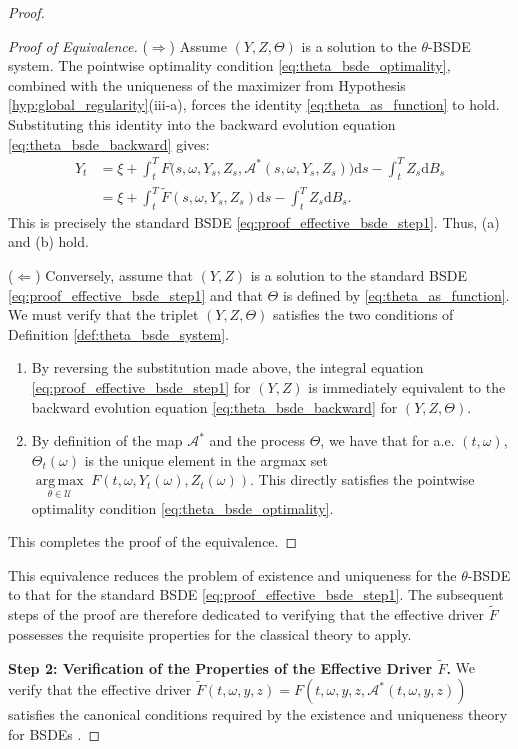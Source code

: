 \documentclass[12pt, letterpaper]{amsart}
\newcommand{\Thetacal}{\mathcal{A}}
\newcommand{\Ucal}{\mathcal{U}}
\newcommand{\dd}{\mathrm{d}}
\DeclareMathOperator*{\argmax}{arg\,max}
\theoremstyle{plain}
\theoremstyle{definition}
\theoremstyle{remark}
\numberwithin{equation}{section} %
\begin{document}
\begin{proof}
\begin{proof}[Proof of Equivalence]
($\Rightarrow$) Assume $(Y,Z,\Theta)$ is a solution to the $\theta$-BSDE system. The pointwise optimality condition \eqref{eq:theta_bsde_optimality}, combined with the uniqueness of the maximizer from Hypothesis \ref{hyp:global_regularity}(iii-a), forces the identity \eqref{eq:theta_as_function} to hold. Substituting this identity into the backward evolution equation \eqref{eq:theta_bsde_backward} gives:
\begin{align*}
    Y_t &= \xi + \int_t^T F\big(s, \omega, Y_s, Z_s, \Thetacal^*(s, \omega, Y_s, Z_s)\big) \dd s - \int_t^T Z_s \dd B_s \\
        &= \xi + \int_t^T \tilde{F}(s, \omega, Y_s, Z_s) \dd s - \int_t^T Z_s \dd B_s.
\end{align*}
This is precisely the standard BSDE \eqref{eq:proof_effective_bsde_step1}. Thus, (a) and (b) hold.

($\Leftarrow$) Conversely, assume that $(Y,Z)$ is a solution to the standard BSDE \eqref{eq:proof_effective_bsde_step1} and that $\Theta$ is defined by \eqref{eq:theta_as_function}. We must verify that the triplet $(Y,Z,\Theta)$ satisfies the two conditions of Definition \ref{def:theta_bsde_system}.
\begin{enumerate}
    \item By reversing the substitution made above, the integral equation \eqref{eq:proof_effective_bsde_step1} for $(Y,Z)$ is immediately equivalent to the backward evolution equation \eqref{eq:theta_bsde_backward} for $(Y,Z,\Theta)$.
    \item By definition of the map $\Thetacal^*$ and the process $\Theta$, we have that for a.e. $(t,\omega)$, $\Theta_t(\omega)$ is the unique element in the argmax set $\underset{\theta \in \Ucal}{\argmax} \; F(t, \omega, Y_t(\omega), Z_t(\omega))$. This directly satisfies the pointwise optimality condition \eqref{eq:theta_bsde_optimality}.
\end{enumerate}
This completes the proof of the equivalence.
\end{proof}

This equivalence reduces the problem of existence and uniqueness for the $\theta$-BSDE to that for the standard BSDE \eqref{eq:proof_effective_bsde_step1}. The subsequent steps of the proof are therefore dedicated to verifying that the effective driver $\tilde{F}$ possesses the requisite properties for the classical theory to apply.

\vspace{1ex}
\noindent\textbf{Step 2: Verification of the Properties of the Effective Driver $\tilde{F}$.}
We verify that the effective driver $\tilde{F}(t,\omega,y,z) = F(t, \omega, y, z, \Thetacal^*(t,\omega,y,z))$ satisfies the canonical conditions required by the existence and uniqueness theory for BSDEs \cite{PardouxPeng1990}.


\end{proof}
\end{document}
